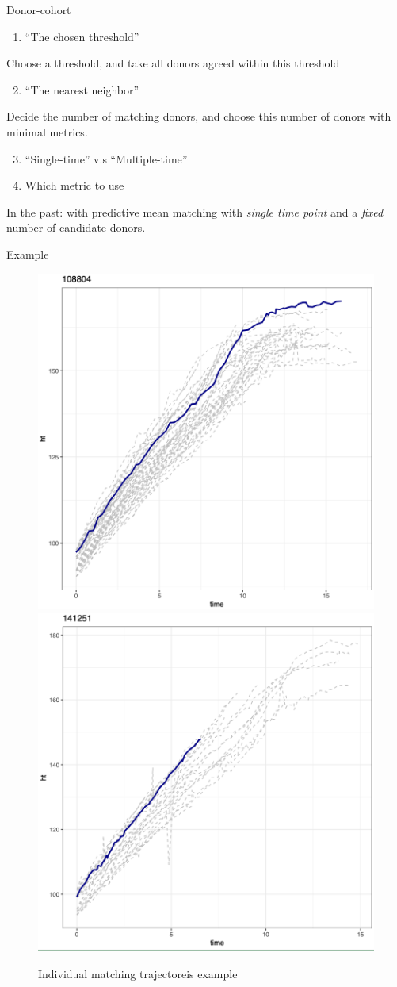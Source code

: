 \documentclass[
  8pt,
  ignorenonframetext,
]{beamer}
\providecommand{\tightlist}{%
  \setlength{\itemsep}{0pt}\setlength{\parskip}{0pt}}
\begin{document}
\begin{frame}{Donor-cohort}
\protect\hypertarget{donor-cohort}{}
\begin{enumerate}
\tightlist
\item
  ``The chosen threshold''
\end{enumerate}

Choose a threshold, and take all donors agreed within this threshold

\begin{enumerate}
\setcounter{enumi}{1}
\tightlist
\item
  ``The nearest neighbor''
\end{enumerate}

Decide the number of matching donors, and choose this number of donors
with minimal metrics.

\begin{enumerate}
\setcounter{enumi}{2}
\item
  ``Single-time'' v.s ``Multiple-time''
\item
  Which metric to use
\end{enumerate}

In the past: with predictive mean matching with \emph{single time point}
and a \emph{fixed} number of candidate donors.
\end{frame}

\begin{frame}{Example}
\protect\hypertarget{example}{}
\begin{figure}

{\centering \includegraphics[width=0.4\linewidth]{figure/fig01} \includegraphics[width=0.4\linewidth]{figure/fig02} 

}

\caption{Individual matching trajectoreis example}\label{fig:Example trajectories for sample matching}
\end{figure}
\end{frame}
\end{document}
